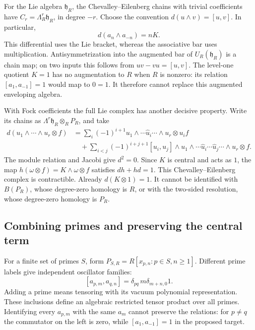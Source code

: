 For the Lie algebra $\mathfrak h_R$, the Chevalley--Eilenberg chains
with trivial coefficients have $C_r=\Lambda_R^r\mathfrak h_R$, in degree
$-r$. Choose the convention $d(u\wedge v)=[u,v]$.
In particular,
\[
 d(a_n\wedge a_{-n})=nK.
\]
This differential uses the Lie bracket, whereas the associative bar
uses multiplication. Antisymmetrization into the augmented bar of
$U_R(\mathfrak h_R)$ is a chain map; on two inputs this follows from
$uv-vu=[u,v]$. The level-one quotient $K=1$ has no augmentation to $R$
when $R$ is nonzero: its relation $[a_1,a_{-1}]=1$ would map to $0=1$.
It therefore cannot replace this augmented enveloping algebra.

With Fock coefficients the full Lie complex has another decisive property.
Write its chains as $\Lambda^r\mathfrak h_R\otimes_R P_R$, and take
\[
 \begin{aligned}
 d(u_1\wedge\cdots\wedge u_r\otimes f)
 &=\sum_i(-1)^{i+1}u_1\wedge\cdots\widehat u_i\cdots\wedge u_r
       \otimes u_if\\
 &\quad+\sum_{i<j}(-1)^{i+j+1}[u_i,u_j]\wedge
       u_1\wedge\cdots\widehat u_i\cdots\widehat u_j\cdots\wedge u_r
       \otimes f.
 \end{aligned}
\]
The module relation and Jacobi give $d^2=0$.
Since $K$ is central and acts as $1$, the map
$h(\omega\otimes f)=K\wedge\omega\otimes f$ satisfies
$dh+hd=1$. This Chevalley--Eilenberg complex is contractible.
Already $d(K\otimes1)=1$.
It cannot be identified with $B(P_R)$, whose degree-zero homology is $R$,
or with the two-sided resolution, whose degree-zero homology is $P_R$.

\subsection{Combining primes and preserving the central term}

For a finite set of primes $S$, form
$P_{S,R}=R[x_{p,n}:p\in S,n\ge1]$.
Different prime labels give independent oscillator families:
\[
 [a_{p,m},a_{q,n}]=\delta_{pq}\,m\delta_{m+n,0}1.
\]
Adding a prime means tensoring with its vacuum polynomial representation.
These inclusions define an algebraic restricted tensor product over all
primes. Identifying every $a_{p,m}$ with the same $a_m$ cannot preserve
the relations: for $p\ne q$ the commutator on the left is zero,
while $[a_1,a_{-1}]=1$ in the proposed target.

